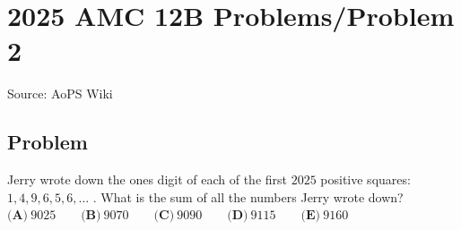\documentclass[12pt]{article}
\begin{document}
\section*{{2025 AMC 12B Problems/Problem 2}}
Source: AoPS Wiki

\subsection*{Problem}
Jerry wrote down the ones digit of each of the first $2025$ positive squares: $1, 4, 9, 6, 5, 6, \dots$ . What is the sum of all the numbers Jerry wrote down? $\textbf{(A)}~9025 \qquad \textbf{(B)}~9070 \qquad \textbf{(C)}~9090 \qquad \textbf{(D)}~9115 \qquad \textbf{(E)}~9160$
\end{document}
